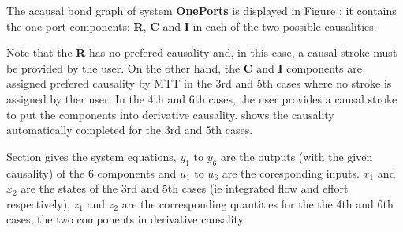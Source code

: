 

   The acausal bond graph of system \textbf{OnePorts} is
   displayed in Figure ; it contains the one
   port components: \textbf{R}, \textbf{C} and \textbf{I} in each of
   the two possible causalities.

   Note that the \textbf{R} has no prefered causality and, in this
   case, a causal stroke must be provided by the user. On the other
   hand, the \textbf{C} and \textbf{I} components are assigned
   prefered causality by MTT in the 3rd and 5th cases where no stroke
   is assigned by ther user. In the 4th and 6th cases, the user
   provides a causal stroke to put the components into derivative
   causality.  shows the causality
   automatically completed for the 3rd and 5th cases.
   
   Section  gives the system equations, $y_1$ to
   $y_6$ are the outputs (with the given causality) of the 6
   components and $u_1$ to $u_6$ are the coresponding inputs. $x_1$
   and $x_2$ are the states of the 3rd and 5th cases (ie integrated
   flow and effort respectively), $z_1$ and $z_2$ are the
   corresponding quantities for the the 4th and 6th cases, the two
   components in derivative causality.

